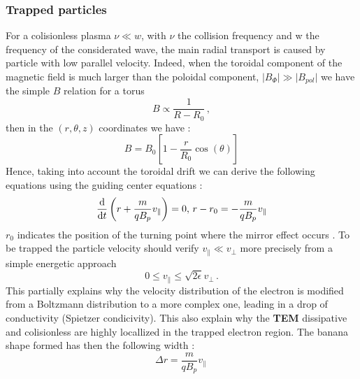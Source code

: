 \documentclass[11pt,a4paper,openany]{report}
\begin{document}
\begin{multicols}{2}
    \subsubsection{Trapped particles}
    For a colisionless plasma $ \nu \ll w$, with $\nu$ the collision frequency and w the frequency of the considerated wave, the main radial transport is caused by particle with low parallel velocity. Indeed, when the toroidal component of the magnetic field is much larger than the poloidal component, $\vert B_\Phi \vert \gg \vert B_{pol} \vert$ we have the simple $B$ relation for a torus $$B\propto \frac{1}{R-R_0} \, , $$ then in the $(r, \theta, z)$ coordinates we have  :
    $$B = B_0\left[1 - \frac{r}{R_0}\cos(\theta)\right]$$
    Hence, taking into account the toroidal drift we can derive the following equations using the guiding center equations \cite{book_banana}:
    $$\dv{t}\left( r +\frac{m}{qB_p}v_\parallel\right) = 0 ,\, r - r_0 = -\frac{m}{qB_p}v_\parallel$$
    $r_0$ indicates the position of the turning point where the mirror effect occurs \cite{TEM_mirror_localization}. To be trapped the particle velocity should verify $v_\parallel \ll v_\perp$ more precisely from a simple energetic approach \cite{TEM_slow}$$0 \leq v_\parallel \leq \sqrt{2\epsilon} v_\perp \,.$$ This partially explains why the velocity distribution of the electron \cite{TEM_slow,Banana_distr_runaway}is modified from a Boltzmann distribution to a more complex one, leading in a drop of conductivity (Spietzer condicivity). This also explain why the \textbf{TEM} dissipative and colisionless are highly locallized in the trapped electron region. The banana shape formed has then the following width :
    $$\Delta r = \frac{m}{qB_p}v_\parallel \, $$


\end{multicols}
\end{document}
